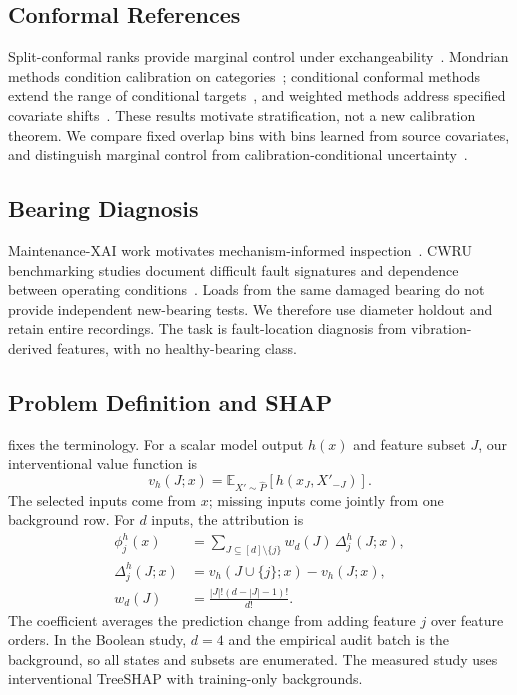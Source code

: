 \documentclass[conference]{IEEEtran}
\begin{document}
\subsection{Conformal References}
Split-conformal ranks provide marginal control under exchangeability~\cite{angelopoulos2023conformal}. Mondrian methods condition calibration on categories~\cite{vovk2005algorithmic,vovk2012conditional}; conditional conformal methods extend the range of conditional targets~\cite{gibbs2025conditional}, and weighted methods address specified covariate shifts~\cite{tibshirani2019shift}. These results motivate stratification, not a new calibration theorem. We compare fixed overlap bins with bins learned from source covariates, and distinguish marginal control from calibration-conditional uncertainty~\cite{vovk2012conditional,bates2023outliers}.

\subsection{Bearing Diagnosis}
Maintenance-XAI work motivates mechanism-informed inspection~\cite{matzka2020explainable,vollert2021interpretable}. CWRU benchmarking studies document difficult fault signatures and dependence between operating conditions~\cite{smith2015cwru,hendriks2022benchmarking}. Loads from the same damaged bearing do not provide independent new-bearing tests. We therefore use diameter holdout and retain entire recordings. The task is fault-location diagnosis from vibration-derived features, with no healthy-bearing class.

\subsection{Problem Definition and SHAP}
 fixes the terminology. For a scalar model output $h(x)$ and feature subset $J$, our interventional value function is
\begin{equation}
 v_h(J;x)=\mathbb E_{X'\sim\widehat P}[h(x_J,X'_{-J})].
 \label{eq:background}
\end{equation}
The selected inputs come from $x$; missing inputs come jointly from one background row. For $d$ inputs, the attribution is
\begin{align}
 \phi_j^h(x)&=\sum_{J\subseteq[d]\setminus\{j\}}w_d(J)\,\Delta_j^h(J;x),\label{eq:shap}\\
 \Delta_j^h(J;x)&=v_h(J\cup\{j\};x)-v_h(J;x),\\
 w_d(J)&=\frac{|J|!(d-|J|-1)!}{d!}.
\end{align}
The coefficient averages the prediction change from adding feature $j$ over feature orders. In the Boolean study, $d=4$ and the empirical audit batch is the background, so all states and subsets are enumerated. The measured study uses interventional TreeSHAP with training-only backgrounds.
\end{document}
